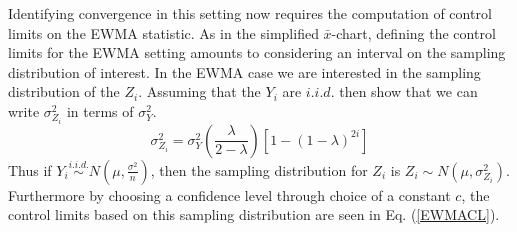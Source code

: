 \documentclass{article}
\begin{document}


Identifying convergence in this setting now requires the computation of 
control limits on the EWMA statistic. As in the simplified $\bar x$-chart, 
defining the control limits for the EWMA setting amounts to considering an 
interval on the sampling distribution of interest. In the EWMA case we are 
interested in the sampling distribution of the $Z_i$. Assuming that the $Y_i$ 
are $i.i.d.$ then \cite{ewmaPaper} show that we can write $\sigma^2_{Z_i}$ in 
terms of $\sigma^2_{Y}$. 
%
\begin{equation}
\sigma^2_{Z_i} = \sigma^2_{Y}\left(\frac{\lambda}{2-\lambda}\right)\left[1-(1-\lambda)^{2i}\right]
\end{equation}
Thus if $Y_i \stackrel{i.i.d.}{\sim} N\left(\mu, \frac{\sigma^2}{n}\right)$, 
then the sampling distribution for $Z_i$ is $Z_i \sim N\left(\mu, \sigma^2_{Z_i}\right)$.
Furthermore by choosing a confidence level through choice of a constant $c$, 
the control limits based on this sampling distribution are seen in Eq. (\ref{EWMACL}).
\end{document}
